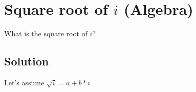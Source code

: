 \section {Square root of $i$ (Algebra)}

What is the square root of $i$?

\subsection{Solution}

Let's assume $\sqrt{i} = a + b*i$
